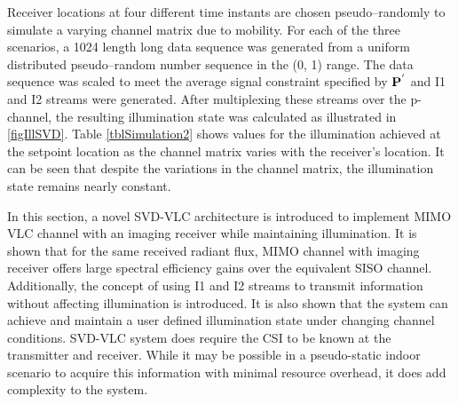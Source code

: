 Receiver locations at four different time instants are chosen pseudo--randomly to simulate a varying channel matrix due to mobility. For each of the three scenarios, a 1024 length long data sequence was generated from a uniform distributed pseudo--random number sequence in the (0, 1) range. The data sequence was scaled to meet the average signal constraint specified by ${\bf{P}}^{'}$ and I1 and I2 streams were generated. After multiplexing these streams over the p-channel, the resulting illumination state was calculated as illustrated in \figurename{ \ref{figIllSVD}}. Table \ref{tblSimulation2} shows values for the illumination achieved at the setpoint location as the channel matrix varies with the receiver's location. It can be seen that despite the variations in the channel matrix, the illumination state remains nearly constant.

In this section, a novel SVD-VLC architecture is introduced to implement MIMO VLC channel with an imaging receiver while maintaining illumination. It is shown that for the same received radiant flux, MIMO channel with imaging receiver offers large spectral efficiency gains over the equivalent SISO channel. Additionally, the concept of using I1 and I2 streams to transmit information without affecting illumination is introduced. It is also shown that the system can achieve and maintain a user defined illumination state under changing channel conditions. SVD-VLC system does require the CSI to be known at the transmitter and receiver. While it may be possible in a pseudo-static indoor scenario to acquire this information with minimal resource overhead, it does add complexity to the system.
